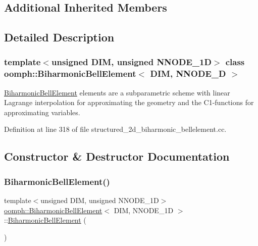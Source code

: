 \subsection*{Additional Inherited Members}


\subsection{Detailed Description}
\subsubsection*{template$<$unsigned D\+IM, unsigned N\+N\+O\+D\+E\+\_\+1D$>$\newline
class oomph\+::\+Biharmonic\+Bell\+Element$<$ D\+I\+M, N\+N\+O\+D\+E\+\_\+D $>$}

\hyperlink{classoomph_1_1BiharmonicBellElement}{Biharmonic\+Bell\+Element} elements are a subparametric scheme with linear Lagrange interpolation for approximating the geometry and the C1-\/functions for approximating variables. 

Definition at line 318 of file structured\+\_\+2d\+\_\+biharmonic\+\_\+bellelement.\+cc.



\subsection{Constructor \& Destructor Documentation}
\mbox{\label{classoomph_1_1BiharmonicBellElement_a1b96f84a9a0c2a088b951c4dda757caf}} 
\subsubsection{\texorpdfstring{Biharmonic\+Bell\+Element()}{BiharmonicBellElement()}\hspace{0.1cm}{\footnotesize\ttfamily [1/2]}}
{\footnotesize\ttfamily template$<$unsigned D\+IM, unsigned N\+N\+O\+D\+E\+\_\+1D$>$ \\
\hyperlink{classoomph_1_1BiharmonicBellElement}{oomph\+::\+Biharmonic\+Bell\+Element}$<$ D\+IM, N\+N\+O\+D\+E\+\_\+1D $>$\+::\hyperlink{classoomph_1_1BiharmonicBellElement}{Biharmonic\+Bell\+Element} (\begin{DoxyParamCaption}{ }\end{DoxyParamCaption})\hspace{0.3cm}{\ttfamily [inline]}}



